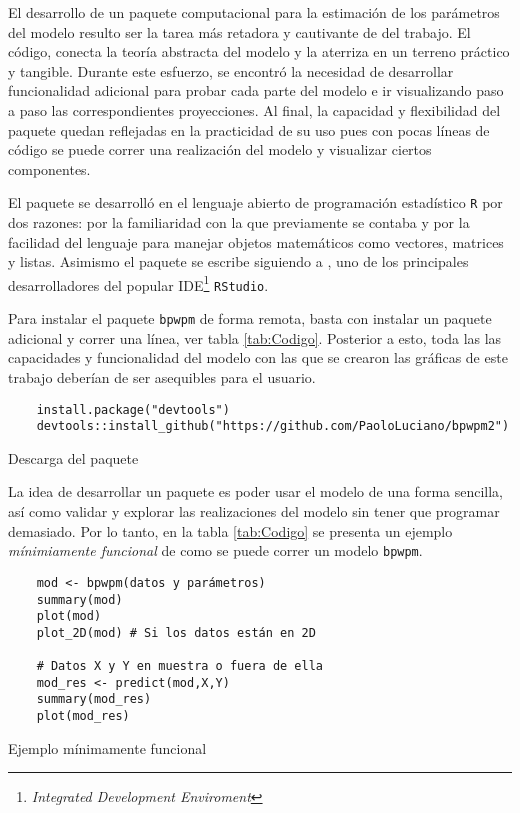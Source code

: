 \documentclass[../../Main/Main.tex]{subfiles}
\begin{document}
El desarrollo de un paquete computacional para la estimación de los parámetros del modelo resulto ser la tarea más retadora y cautivante de del trabajo. El código, conecta la teoría abstracta del modelo y la aterriza en un terreno práctico y tangible. Durante este esfuerzo, se encontró la necesidad de desarrollar funcionalidad adicional para probar cada parte del modelo e ir visualizando paso a paso las correspondientes proyecciones. Al final, la capacidad y flexibilidad del paquete quedan reflejadas en la practicidad de su uso pues con pocas líneas de código se puede correr una realización del modelo y visualizar ciertos componentes.

El paquete se desarrolló en el lenguaje abierto de programación estadístico \verb|R| por dos razones: por la familiaridad con la que previamente se contaba y por la facilidad del lenguaje para manejar objetos matemáticos como vectores, matrices y listas.  Asimismo el paquete se escribe siguiendo a \citet{}, uno de los principales desarrolladores del popular IDE\footnote{\emph{Integrated Development Enviroment}} \verb|RStudio|. 

Para instalar el paquete \verb|bpwpm| de forma remota, basta con instalar un paquete adicional y correr una línea, ver tabla \ref{tab:Codigo}. Posterior a esto, toda las las capacidades y funcionalidad del modelo con las que se crearon las gráficas de este trabajo deberían de ser asequibles para el usuario.

\begin{table}[h]
\makebox[\linewidth]{\rule{\textwidth}{0.4pt}}
\begin{verbatim}
	install.package("devtools")
	devtools::install_github("https://github.com/PaoloLuciano/bpwpm2")
\end{verbatim}
\makebox[\linewidth]{\rule{\textwidth}{0.4pt}}
\caption{Descarga del paquete}
\label{tab:Descarga}
\end{table}

La idea de desarrollar un paquete es poder usar el modelo de una forma sencilla, así como validar y explorar las realizaciones del modelo sin tener que programar demasiado. Por lo tanto, en la tabla \ref{tab:Codigo} se presenta un ejemplo \textit{mínimiamente funcional} de como se puede correr un modelo \verb|bpwpm|.

\begin{table}[h]
\makebox[\linewidth]{\rule{\textwidth}{0.4pt}}
\begin{verbatim}
	mod <- bpwpm(datos y parámetros)
	summary(mod)
	plot(mod) 
	plot_2D(mod) # Si los datos están en 2D 

	# Datos X y Y en muestra o fuera de ella	
	mod_res <- predict(mod,X,Y)
	summary(mod_res)
	plot(mod_res)
\end{verbatim}
\makebox[\linewidth]{\rule{\textwidth}{0.4pt}}
\caption{Ejemplo mínimamente funcional}
\label{tab:Codigo}
\end{table}
\end{document}
